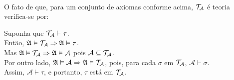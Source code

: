         \paragraph{}
            O fato de que, para um conjunto de axiomas conforme acima, $\mathcal{T}_{\mathcal{A}}$ é teoria 
            verifica-se por:
        \begin{proof*}
            Suponha que $\mathcal{T}_{\mathcal{A}}\vdash\tau$.
            \\Então, $\mathfrak{A}\vDash\mathcal{T}_{\mathcal{A}}\Rightarrow\mathfrak{A}\vDash\tau$.\\
            Mas $\mathfrak{A}\vDash\mathcal{T}_{\mathcal{A}}\Rightarrow\mathfrak{A}\vDash\mathcal{A}$ pois 
            $\mathcal{A}\subseteq\mathcal{T}_{\mathcal{A}}$.\\
            Por outro lado, $\mathfrak{A}\vDash\mathcal{A}\Rightarrow\mathfrak{A}\vDash\mathcal{T}_{\mathcal{A}}$, 
            pois, para cada $\sigma$ em $\mathcal{T}_{\mathcal{A}}$, $\mathcal{A}\vdash\sigma$.\\
            Assim, $\mathcal{A}\vdash\tau$, e portanto, $\tau$ está em $\mathcal{T}_{\mathcal{A}}$.
        \end{proof*}
        